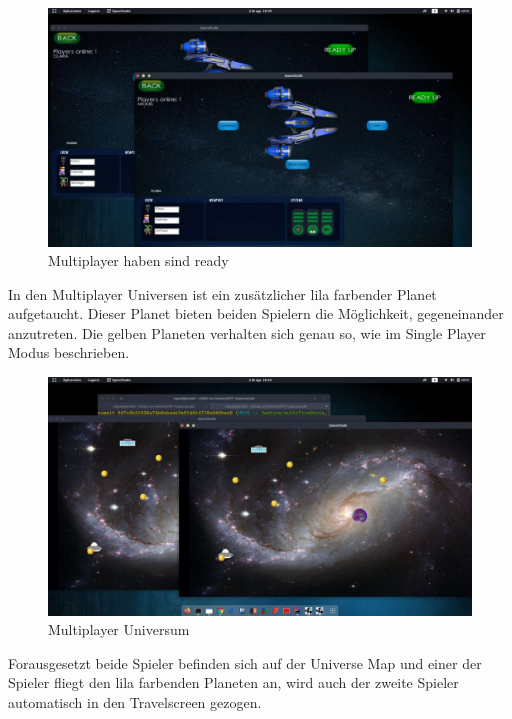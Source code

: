 \documentclass[fontsize=12pt,paper=a4,twoside]{scrartcl}
\begin{document}
\begin{figure}[htp]
	\centering
	\includegraphics[width=1.00\linewidth]{pics/4.PNG}
	\caption{Multiplayer haben sind ready}
\end{figure}

In den Multiplayer Universen ist ein zusätzlicher lila farbender Planet aufgetaucht.
Dieser Planet bieten beiden Spielern die Möglichkeit, gegeneinander anzutreten.
Die gelben Planeten verhalten sich genau so, wie im Single Player Modus beschrieben.

\begin{figure}[htp]
	\centering
	\includegraphics[width=1.00\linewidth]{pics/5.PNG}
	\caption{Multiplayer Universum}
\end{figure}

Forausgesetzt beide Spieler befinden sich auf der Universe Map und einer der Spieler
fliegt den lila farbenden Planeten an, wird auch der zweite Spieler automatisch in den Travelscreen gezogen.
\end{document}
